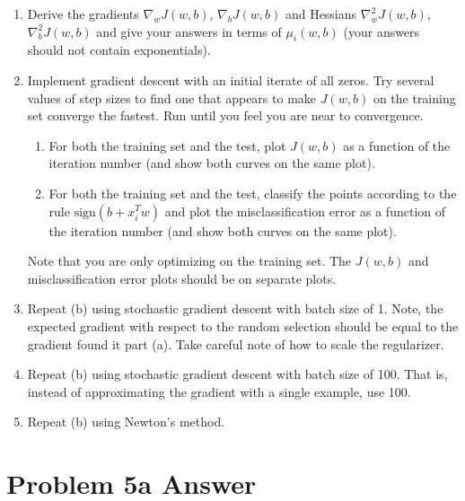 \documentclass{article}
\newcommand{\1}{\mathbf{1}}
\begin{document}
\begin{enumerate}
  \item Derive the gradients $\nabla_w J(w,b)$, $\nabla_{b} J(w,b)$ and Hessians $\nabla_w^2 J(w,b)$, $\nabla_{b}^2 J(w,b)$ and give your answers in terms of $\mu_i(w,b)$ (your answers should not contain exponentials).
  \item Implement gradient descent with an initial iterate of all zeros. Try several values of step sizes to find one that appears to make $J(w,b)$ on the training set converge the fastest. Run until you feel you are near to convergence.
  \begin{enumerate}
    \item For both the training set and the test, plot $J(w,b)$ as a function of the iteration number (and show both curves on the same plot).  
    \item For both the training set and the test, classify the points according to the rule $\text{sign}(b + x_i^T w)$ and plot the misclassification error as a function of the iteration number (and show both curves on the same plot). 
  \end{enumerate}
  Note that you are only optimizing on the training set. The $J(w,b)$ and misclassification error plots should be on separate plots.
  \item Repeat (b) using stochastic gradient descent with batch size of 1. Note, the expected gradient with respect to the random selection should be equal to the gradient found it part (a). Take careful note of how to scale the regularizer.
  \item Repeat (b) using stochastic gradient descent with batch size of 100. That is, instead of approximating the gradient with a single example, use 100.
  \item Repeat (b) using Newton's method.  
\end{enumerate}







\section*{Problem 5a Answer}
\end{document}
